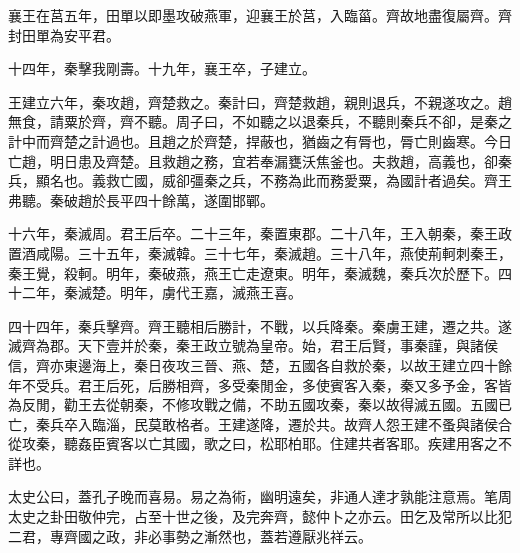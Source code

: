 襄王在莒五年，田單以即墨攻破燕軍，迎襄王於莒，入臨菑。齊故地盡復屬齊。齊封田單為安平君。

十四年，秦擊我剛壽。十九年，襄王卒，子建立。

王建立六年，秦攻趙，齊楚救之。秦計曰，齊楚救趙，親則退兵，不親遂攻之。趙無食，請粟於齊，齊不聽。周子曰，不如聽之以退秦兵，不聽則秦兵不卻，是秦之計中而齊楚之計過也。且趙之於齊楚，捍蔽也，猶齒之有脣也，脣亡則齒寒。今日亡趙，明日患及齊楚。且救趙之務，宜若奉漏甕沃焦釜也。夫救趙，高義也，卻秦兵，顯名也。義救亡國，威卻彊秦之兵，不務為此而務愛粟，為國計者過矣。齊王弗聽。秦破趙於長平四十餘萬，遂圍邯鄲。

十六年，秦滅周。君王后卒。二十三年，秦置東郡。二十八年，王入朝秦，秦王政置酒咸陽。三十五年，秦滅韓。三十七年，秦滅趙。三十八年，燕使荊軻刺秦王，秦王覺，殺軻。明年，秦破燕，燕王亡走遼東。明年，秦滅魏，秦兵次於歷下。四十二年，秦滅楚。明年，虜代王嘉，滅燕王喜。

四十四年，秦兵擊齊。齊王聽相后勝計，不戰，以兵降秦。秦虜王建，遷之共。遂滅齊為郡。天下壹并於秦，秦王政立號為皇帝。始，君王后賢，事秦謹，與諸侯信，齊亦東邊海上，秦日夜攻三晉、燕、楚，五國各自救於秦，以故王建立四十餘年不受兵。君王后死，后勝相齊，多受秦閒金，多使賓客入秦，秦又多予金，客皆為反閒，勸王去從朝秦，不修攻戰之備，不助五國攻秦，秦以故得滅五國。五國已亡，秦兵卒入臨淄，民莫敢格者。王建遂降，遷於共。故齊人怨王建不蚤與諸侯合從攻秦，聽姦臣賓客以亡其國，歌之曰，松耶柏耶。住建共者客耶。疾建用客之不詳也。

太史公曰，蓋孔子晚而喜易。易之為術，幽明遠矣，非通人達才孰能注意焉。笔周太史之卦田敬仲完，占至十世之後，及完奔齊，懿仲卜之亦云。田乞及常所以比犯二君，專齊國之政，非必事勢之漸然也，蓋若遵厭兆祥云。